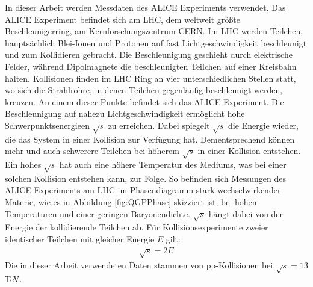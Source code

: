 In dieser Arbeit werden Messdaten des ALICE Experiments verwendet.
Das ALICE Experiment befindet sich am LHC, dem weltweit größte Beschleunigerring, am Kernforschungszentrum CERN.
Im LHC werden Teilchen, hauptsächlich Blei-Ionen und Protonen auf fast Lichtgeschwindigkeit beschleunigt und zum Kollidieren gebracht.
Die Beschleunigung geschieht durch elektrische Felder, während Dipolmagnete die beschleunigten Teilchen auf einer Kreisbahn halten.
Kollisionen finden im LHC Ring an vier unterschiedlichen Stellen statt, wo sich die Strahlrohre, in denen Teilchen gegenläufig beschleunigt werden, kreuzen.
An einem dieser Punkte befindet sich das ALICE Experiment.
\newline
Die Beschleunigung auf nahezu Lichtgeschwindigkeit ermöglicht hohe Schwerpunktsenergieen $\sqrt{s}$ zu erreichen.
Dabei spiegelt $\sqrt{s}$ die Energie wieder, die das System in einer Kollision zur Verfügung hat.
Dementsprechend können mehr und auch schwerere Teilchen bei höherem $\sqrt{s}$  in einer Kollision entstehen.
Ein hohes $\sqrt{s}$ hat auch eine höhere Temperatur des Mediums, was bei einer solchen Kollision entstehen kann, zur Folge.
So befinden sich Messungen des ALICE Experiments am LHC im Phasendiagramm stark wechselwirkender Materie, wie es in Abbildung \ref{fig:QGPPhase} skizziert ist, bei hohen Temperaturen und einer geringen Baryonendichte.
$\sqrt{s}$ hängt dabei von der Energie der kollidierende Teilchen ab.
Für Kollisionsexperimente zweier identischer Teilchen mit gleicher Energie $E$ gilt:
\begin{align}
\sqrt{s} = 2E \label{eq:sqrts}
\end{align}
\newline
Die in dieser Arbeit verwendeten Daten stammen von pp-Kollisionen bei $\sqrt{s} = 13$ TeV.